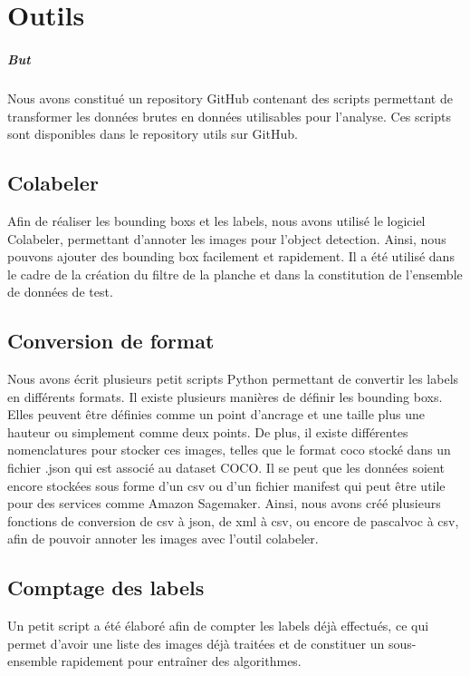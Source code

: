 \chapter{Outils}

\paragraph*{But}

Nous avons constitué un repository GitHub contenant des scripts permettant de transformer les données brutes en données utilisables pour l'analyse. Ces scripts sont disponibles dans le repository utils sur GitHub.

\section{Colabeler}

Afin de réaliser les bounding boxs et les labels, nous avons utilisé le logiciel Colabeler, permettant d'annoter les images pour l'object detection. Ainsi, nous pouvons ajouter des bounding box facilement et rapidement. Il a été utilisé dans le cadre de la création du filtre de la planche et dans la constitution de l'ensemble de données de test.

\section{Conversion de format}

Nous avons écrit plusieurs petit scripts Python permettant de convertir les labels en différents formats. Il existe plusieurs manières de définir les bounding boxs. Elles peuvent être définies comme un point d'ancrage et une taille plus une hauteur ou simplement comme deux points. De plus, il existe différentes nomenclatures pour stocker ces images, telles que le format coco stocké dans un fichier .json qui est associé au dataset COCO. Il se peut que les données soient encore stockées sous forme d'un csv ou d'un fichier manifest qui peut être utile pour des services comme Amazon Sagemaker. Ainsi, nous avons créé plusieurs fonctions de conversion de csv à json, de xml à csv, ou encore de pascalvoc à csv, afin de pouvoir annoter les images avec l'outil colabeler.

\section{Comptage des labels}

Un petit script a été élaboré afin de compter les labels déjà effectués, ce qui permet d'avoir une liste des images déjà traitées et de constituer un sous-ensemble rapidement pour entraîner des algorithmes.

